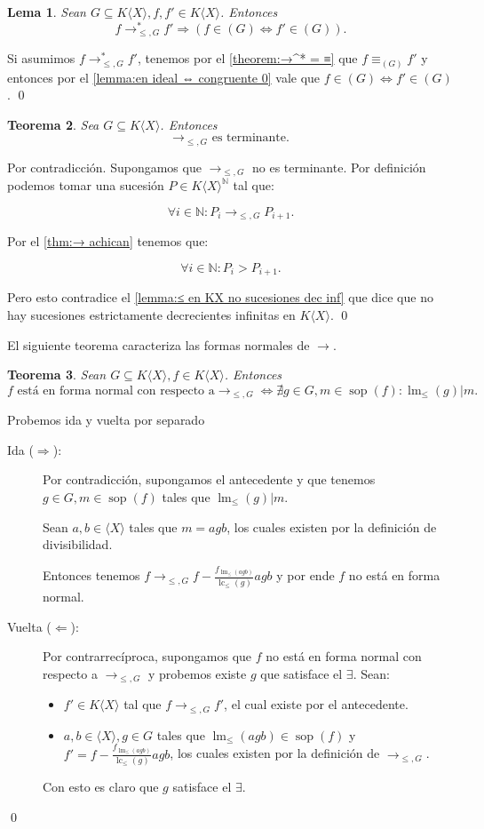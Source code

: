 \documentclass[12pt]{report}
\theoremstyle{customstyle}
\newtheorem{theorem}{Teorema}[chapter]
\newtheorem{lemma}[theorem]{Lema}
\renewenvironment{proof}[1][\proofname]{{\noindent \bfseries #1: }}{\qed} %
\theoremstyle{factstyle}
\DeclareMathOperator{\sop}{sop}
\DeclareMathOperator{\lm}{lm}
\DeclareMathOperator{\lc}{lc}
\begin{document}
\begin{lemma}\label{thm:→ mantiene pertenencia a ideal}
  Sean $G ⊆ K⟨X⟩, f, f' ∈ K⟨X⟩$. Entonces
  \[ f →^*_{≤, G} f' ⇒ (f ∈ (G) ⇔ f' ∈ (G)) \text{.}\]
\end{lemma}
\begin{proof}
  Si asumimos $f →^*_{≤, G} f'$, tenemos por el \cref{theorem:→^* = ≡} que $f ≡_{(G)} f'$ y entonces por el \cref{lemma:en ideal ⇔ congruente 0} vale que $f ∈ (G) ⇔ f' ∈ (G)$.
\end{proof}

\begin{theorem}
  Sea $G ⊆ K⟨X⟩$. Entonces
  \[ →_{≤, G} \text{ es terminante.} \]
\end{theorem}
\begin{proof}
  Por contradicción. Supongamos que $→_{≤, G}$ no es terminante. Por definición podemos tomar una sucesión $P ∈ K⟨X⟩^ℕ$ tal que:

  \[ ∀i ∈ ℕ : P_i →_{≤, G} P_{i+1}. \]

  \noindent Por el \cref{thm:→ achican} tenemos que:

  \[ ∀i ∈ ℕ : P_i > P_{i+1}. \]

  \noindent Pero esto contradice el \cref{lemma:≤ en KX no sucesiones dec inf} que dice que no hay sucesiones estrictamente decrecientes infinitas en $K⟨X⟩$.
\end{proof}

El siguiente teorema caracteriza las formas normales de $→$.

\begin{theorem}
  Sean $G ⊆ K⟨X⟩, f ∈ K⟨X⟩$. Entonces
  \[ f\text{ está en forma normal con respecto a} →_{≤, G} ⇔ ∄g ∈ G, m ∈ \sop(f) : \lm_≤(g) | m \text{.}\]
\end{theorem}
\begin{proof} Probemos ida y vuelta por separado
  \begin{description}
    \item[Ida ($⇒$):] Por contradicción, supongamos el antecedente y que tenemos $g ∈ G, m ∈ \sop(f)$ tales que $\lm_≤(g) | m$.

    \noindent Sean $a, b ∈ ⟨X⟩$ tales que $m = agb$, los cuales existen por la definición de divisibilidad.

    \noindent Entonces tenemos $f →_{≤, G} f - \frac{f_{\lm_≤(agb)}}{\lc_≤(g)}agb$ y por ende $f$ no está en forma normal.

    \item[Vuelta ($⇐$):] Por contrarrecíproca, supongamos que $f$ no está en forma normal con respecto a $→_{≤, G}$ y probemos existe $g$ que satisface el $∃$. Sean:
    \begin{itemize}
      \item $f' ∈ K⟨X⟩$ tal que $f →_{≤, G} f'$, el cual existe por el antecedente.
      \item $a, b ∈ ⟨X⟩, g ∈ G$ tales que $\lm_≤(agb) ∈ \sop(f)$ y $f' = f - \frac{f_{\lm_≤(agb)}}{\lc_≤(g)}agb$, los cuales existen por la definición de $→_{≤, G}$.
    \end{itemize}

    Con esto es claro que $g$ satisface el $∃$.
  \end{description}
\end{proof}
\end{document}
